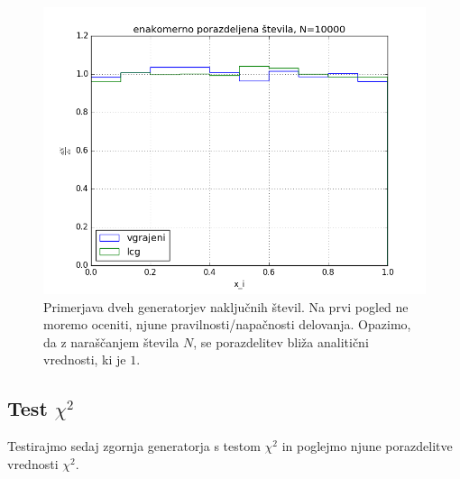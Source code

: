 \documentclass[slovene,11pt,a4paper]{article}
\numberwithin{equation}{section} %
\numberwithin{figure}{section} %
\numberwithin{table}{section} %
\begin{document}
\begin{figure}[h]
\begin{minipage}{0.5\textwidth}
\includegraphics[scale=0.4]{slike/enakomerna_porazdelitev_N10000.png}
\end{minipage}\hfill

\caption{Primerjava dveh generatorjev naključnih števil. Na prvi pogled ne moremo oceniti, njune pravilnosti/napačnosti delovanja. Opazimo, da z naraščanjem števila $N$, se porazdelitev bliža analitični vrednosti, ki je $1$.}
\end{figure}



\clearpage



\subsection{Test $\chi^2$}
Testirajmo sedaj zgornja generatorja s testom $\chi^2$ in poglejmo njune porazdelitve vrednosti $\chi^2$.
\end{document}
